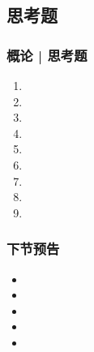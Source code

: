 \subsection{思考题}
\begin{frame}
  \frametitle{概论 | 思考题}
  \begin{enumerate}
    \item 
    \item 
    \item 
    \item 
    \item 
    \item 
    \item 
    \item 
    \item 
  \end{enumerate}
\end{frame}

\begin{frame}
  \frametitle{下节预告}
  \begin{itemize}
    \item 
    \item 
    \item 
    \item 
    \item 
  \end{itemize}
\end{frame}




